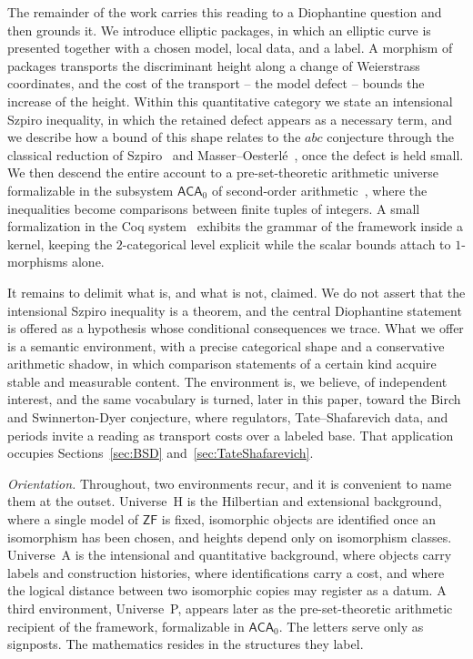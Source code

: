 \documentclass[10pt, reqno]{amsart}
\theoremstyle{plain}
\theoremstyle{definition}
\theoremstyle{plain}
\newcommand{\ZF}{\mathsf{ZF}}
\newcommand{\parahead}[1]{%
  \par\medskip
  \noindent\textit{#1.}\enspace
}
\begin{document}
The remainder of the work carries this reading to a Diophantine question and then grounds it. We introduce elliptic packages, in which an elliptic curve is presented together with a chosen model, local data, and a label. A morphism of packages transports the discriminant height along a change of Weierstrass coordinates, and the cost of the transport -- the model defect -- bounds the increase of the height. Within this quantitative category we state an intensional Szpiro inequality, in which the retained defect appears as a necessary term, and we describe how a bound of this shape relates to the $abc$ conjecture through the classical reduction of Szpiro~\cite{Szpiro1990} and Masser--Oesterl\'e~\cite{MasserOesterle1985}, once the defect is held small. We then descend the entire account to a pre-set-theoretic arithmetic universe formalizable in the subsystem $\mathsf{ACA}_0$ of second-order arithmetic~\cite{simpson2009subsystems}, where the inequalities become comparisons between finite tuples of integers. A small formalization in the Coq system~\cite{Bertot2004} exhibits the grammar of the framework inside a kernel, keeping the $2$-categorical level explicit while the scalar bounds attach to $1$-morphisms alone.

It remains to delimit what is, and what is not, claimed. We do not assert that the intensional Szpiro inequality is a theorem, and the central Diophantine statement is offered as a hypothesis whose conditional consequences we trace. What we offer is a semantic environment, with a precise categorical shape and a conservative arithmetic shadow, in which comparison statements of a certain kind acquire stable and measurable content. The environment is, we believe, of independent interest, and the same vocabulary is turned, later in this paper, toward the Birch and Swinnerton-Dyer conjecture, where regulators, Tate--Shafarevich data, and periods invite a reading as transport costs over a labeled base. That application occupies Sections~\ref{sec:BSD} and~\ref{sec:TateShafarevich}.

\parahead{Orientation} Throughout, two environments recur, and it is convenient to name them at the outset. Universe~H is the Hilbertian and extensional background, where a single model of $\ZF$ is fixed, isomorphic objects are identified once an isomorphism has been chosen, and heights depend only on isomorphism classes. Universe~A is the intensional and quantitative background, where objects carry labels and construction histories, where identifications carry a cost, and where the logical distance between two isomorphic copies may register as a datum. A third environment, Universe~P, appears later as the pre-set-theoretic arithmetic recipient of the framework, formalizable in $\mathsf{ACA}_0$. The letters serve only as signposts. The mathematics resides in the structures they label.
\end{document}
